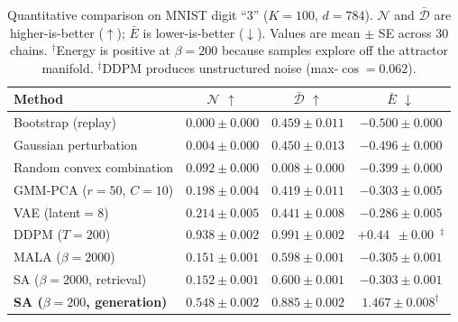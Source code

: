 \begin{table}[t]
\centering
\caption{Quantitative comparison on MNIST digit ``3'' ($K=100$, $d=784$). $\mathcal{N}$ and $\bar{\mathcal{D}}$ are higher-is-better ($\uparrow$); $\bar{E}$ is lower-is-better ($\downarrow$). Values are mean $\pm$ SE across 30 chains. $^\dagger$Energy is positive at $\beta{=}200$ because samples explore off the attractor manifold. $^\ddagger$DDPM produces unstructured noise (max-$\cos=0.062$).}
\label{tab:mnist-baselines}
\small
\begin{tabular}{@{}lccc@{}}
\toprule
Method & $\mathcal{N}$ $\uparrow$ & $\bar{\mathcal{D}}$ $\uparrow$ & $\bar{E}$ $\downarrow$ \\
\midrule
Bootstrap (replay)          & $0.000 \pm 0.000$ & $0.459 \pm 0.011$ & $-0.500 \pm 0.000$ \\
Gaussian perturbation       & $0.004 \pm 0.000$ & $0.450 \pm 0.013$ & $-0.496 \pm 0.000$ \\
Random convex combination   & $0.092 \pm 0.000$ & $0.008 \pm 0.000$ & $-0.399 \pm 0.000$ \\
GMM-PCA ($r{=}50$, $C{=}10$) & $0.198 \pm 0.004$ & $0.419 \pm 0.011$ & $-0.303 \pm 0.005$ \\
VAE (latent${=}8$)          & $0.214 \pm 0.005$ & $0.441 \pm 0.008$ & $-0.286 \pm 0.005$ \\
DDPM ($T{=}200$)            & $0.938 \pm 0.002$ & $0.991 \pm 0.002$ & $+0.44\phantom{0} \pm 0.00\phantom{0}$$^\ddagger$ \\
MALA ($\beta{=}2000$)       & $0.151 \pm 0.001$ & $0.598 \pm 0.001$ & $-0.305 \pm 0.001$ \\
SA ($\beta{=}2000$, retrieval) & $0.152 \pm 0.001$ & $0.600 \pm 0.001$ & $-0.303 \pm 0.001$ \\
\textbf{SA ($\beta{=}200$, generation)} & $\mathbf{0.548 \pm 0.002}$ & $\mathbf{0.885 \pm 0.002}$ & $1.467 \pm 0.008^\dagger$ \\
\bottomrule
\end{tabular}
\end{table}

